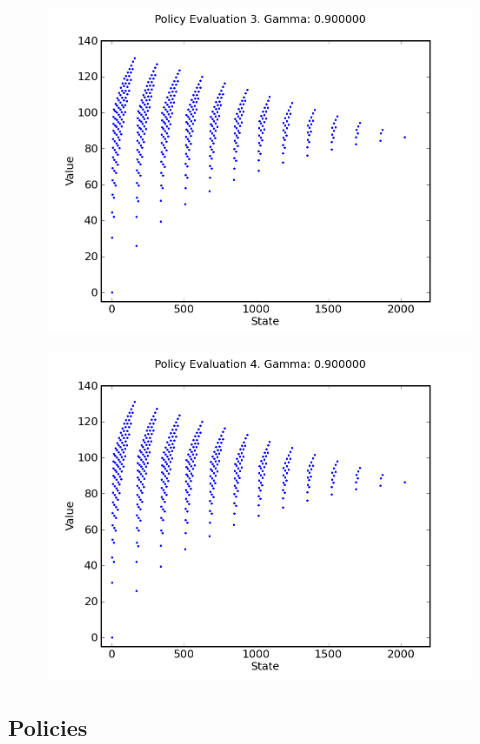 \documentclass[a4paper]{article}
\begin{document}
\begin{figure}[h]
\center
\includegraphics[scale=0.8]{gamma_iteration/gamma_9_3.png}
\end{figure}

\begin{figure}[h]
\center
\includegraphics[scale=0.8]{gamma_iteration/gamma_9_4.png}
\end{figure}

\clearpage

\subsection{Policies}
\end{document}
